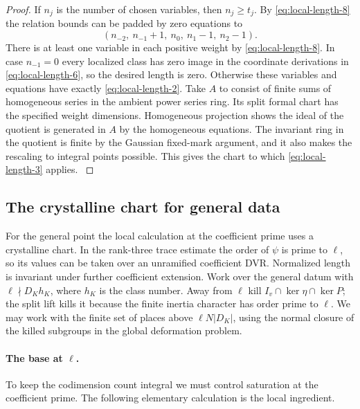 \begin{proof}
If \(n_j\) is the number of chosen variables, then
\(n_j\ge t_j\). By \eqref{eq:local-length-8} the relation bounds can be
padded by zero equations to
\[
 (n_{-2},\ n_{-1}+1,\ n_0,\ n_1-1,\ n_2-1).
\]
There is at least one variable in each positive
weight by \eqref{eq:local-length-8}. In case \(n_{-1}=0\) every
localized class has zero image in the coordinate
derivations in \eqref{eq:local-length-6}, so the desired length is zero.
Otherwise these variables and equations have
exactly \eqref{eq:local-length-2}. Take \(A\) to consist of finite
sums of homogeneous series in the ambient power
series ring. Its split formal chart has the
specified weight dimensions. Homogeneous projection
shows the ideal of the quotient is generated in
\(A\) by the homogeneous equations. The invariant
ring in the quotient is finite by the Gaussian
fixed-mark argument, and it also makes the
rescaling to integral points possible. This gives
the chart to which \eqref{eq:local-length-3} applies.
\hfill\mbox{\cite{milne-duality}}\label{cor:ordinary-rank-three-length-4}

\end{proof}

\subsection{The crystalline chart for general data}

For the general point the local calculation at the coefficient prime uses a
crystalline chart. In the rank-three trace estimate the order of \(\psi\) is prime to \(\ell\),
so its values can be taken over an unramified
coefficient DVR. Normalized length is invariant
under further coefficient extension. Work over
the general datum with \(\ell\nmid D_K h_K\),
where \(h_K\) is the class number. Away from \(\ell\)
kill \(I_v\cap\ker\eta\cap\ker P\); the split lift
kills it because the finite inertia character has
order prime to \(\ell\). We may work with the
finite set of places above \(\ell N|D_K|\), using
the normal closure of the killed subgroups in the
global deformation problem.

\paragraph{The base at \(\ell\).}
To keep the codimension count integral we must control saturation at the coefficient
prime. The following elementary calculation is the local ingredient.

